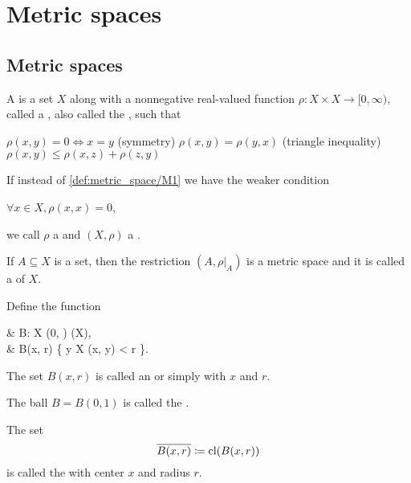 \section{Metric spaces}\label{sec:metric_spaces}
\subsection{Metric spaces}\label{subsec:metric_spaces}

\begin{definition}\label{def:metric_space}
  A  is a set \( X \) along with a nonnegative real-valued function \( \rho: X \times X \to [0, \infty) \), called a , also called the , such that
  \begin{DefEnum}[series=def:metric_space]
     \( \rho(x, y) = 0 \iff x = y \)
    (symmetry) \( \rho(x, y) = \rho(y, x) \)
    (triangle inequality) \( \rho(x, y) \leq \rho(x, z) + \rho(z, y) \)
  \end{DefEnum}

  If instead of \ref{def:metric_space/M1} we have the weaker condition
  \begin{DefEnum}[resume=def:metric_space]
     \( \forall x \in X, \rho(x, x) = 0 \),
  \end{DefEnum}
  we call \( \rho \) a  and \( (X, \rho) \) a .

  \begin{DefEnum}
     If \( A \subseteq X \) is a set, then the restriction \( (A, \rho{\rvert_A}) \) is a metric space and it is called a  of $X$.

     Define the function
    \begin{BreakableAlign*}
       & B: X \times (0, \infty) \to \Pow(X),                   \\
       & B(x, r) \coloneqq \{ y \in X \colon \rho(x, y) < r \}.
    \end{BreakableAlign*}

    The set \( B(x, r) \) is called an  or simply  with  \( x \) and  \( r \).

    The ball \( B = B(0, 1) \) is called the .

     The set
    \begin{equation*}
      \overline{B(x, r)} \coloneqq \operatorname{cl}(B(x, r))
    \end{equation*}
    is called the  with center \( x \) and radius \( r \).


\end{DefEnum}
\end{definition}
